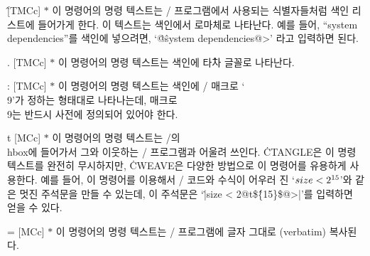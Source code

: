 \@\^ [TMCc] $*$ 이 명령어의 명령 텍스트는 \CEE/
프로그램에서 사용되는 식별자들처럼 색인 리스트에 들어가게 한다. 이 텍스트는 색인에서
로마체로 나타난다. 예를 들어, ``system dependencies''를 색인에
넣으려면, `\.{@\^system dependencies@>}' 라고 입력하면 된다. 

\@. [TMCc] $*$ 이 명령어의 명령 텍스트는 색인에 \.{타자 글꼴}로 나타난다.

\@: [TMCc] $*$ 이 명령어의 명령 텍스트는 색인에 \TEX/ 매크로
`\.{\\9}'가 정하는 형태대로 나타나는데, 매크로 \.{\\9}는 반드시 사전에
정의되어 있어야 한다.

\@{t} [MCc] $*$ 이 명령어의 명령 텍스트는 \TEX/의 \.{\\hbox}에
들어가서 그와 이웃하는 \CEE/ 프로그램과 어울려 쓰인다. \.{CTANGLE}은
이 명령 텍스트를 완전히 무시하지만, \.{CWEAVE}은 다양한 방법으로 이
명령어를 유용하게 사용한다. 예를 들어, 이 명령어를 이용해서 \CEE/ 코드와 수식이
어우러 진 `$\\{size}<2^{15}$'와 같은 멋진 주석문을 만들 수 있는데, 이
주석문은 `\.{|size < 2@t\$\^\{15\}\$@>|}'를 입력하면 얻을 수 있다.

\@= [MCc] $*$ 이 명령어의 명령 텍스트는 \CEE/ 프로그램에 글자 그대로 (verbatim)
복사된다.  

